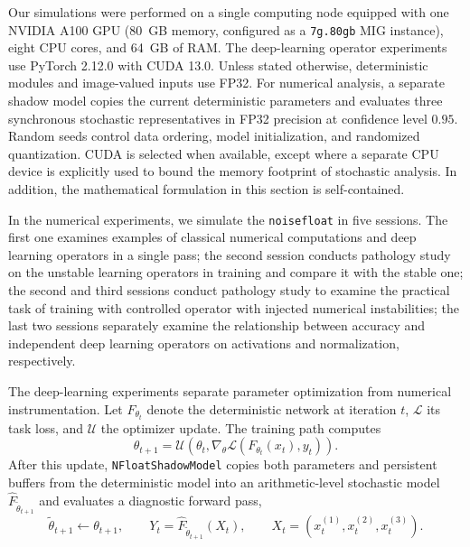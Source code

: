 \documentclass[manuscript, screen]{acmart}
\begin{document}
Our simulations were performed on a single computing node equipped with one NVIDIA A100 GPU (80~GB memory, configured as a \texttt{7g.80gb} MIG instance), eight CPU cores, and 64~GB of RAM. The deep-learning operator experiments use PyTorch 2.12.0 with CUDA 13.0. Unless stated otherwise, deterministic modules and image-valued inputs use FP32. For numerical analysis, a separate shadow model copies the current deterministic parameters and evaluates three synchronous stochastic representatives in FP32 precision at confidence level $0.95$. Random seeds control data ordering, model initialization, and randomized quantization. CUDA is selected when available, except where a separate CPU device is explicitly used to bound the memory footprint of stochastic analysis. In addition, the mathematical formulation in this section is self-contained.


In the numerical experiments, we simulate the \texttt{noisefloat} in five sessions. The first one examines examples of classical numerical computations and deep learning operators in a single pass; the second session conducts pathology study on the unstable learning operators in training and compare it with the stable one; the second and third sessions conduct pathology study to examine the practical task of training with controlled operator with injected numerical instabilities; the last two sessions separately examine the relationship between accuracy and independent deep learning operators on activations and normalization, respectively. 


The deep-learning experiments separate parameter optimization from numerical instrumentation. Let $F_{\theta_t}$ denote the deterministic network at iteration $t$, $\mathcal{L}$ its task loss, and $\mathcal{U}$ the optimizer update. The training path computes
\begin{equation}
\theta_{t+1}
=
\mathcal{U}\!\left(\theta_t,
\nabla_{\theta}\mathcal{L}(F_{\theta_t}(x_t),y_t)\right).
\label{eq:deterministic-training-update}
\end{equation}
After this update, \texttt{NFloatShadowModel} copies both parameters and persistent buffers from the deterministic model into an arithmetic-level stochastic model $\widehat{F}_{\widetilde{\theta}_{t+1}}$ and evaluates a diagnostic forward pass,
\begin{equation}
\widetilde{\theta}_{t+1}\leftarrow\theta_{t+1},
\qquad
Y_t=\widehat{F}_{\widetilde{\theta}_{t+1}}(X_t),
\qquad
X_t=(x_t^{(1)},x_t^{(2)},x_t^{(3)}).
\label{eq:shadow-evaluation}
\end{equation}
\end{document}
